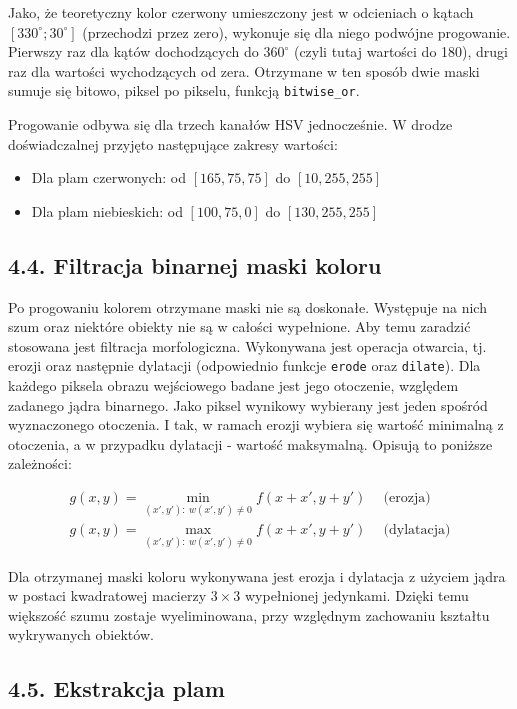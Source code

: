 \documentclass[11pt,a4paper,twoside]{report}
\begin{document}
			Jako, że teoretyczny kolor czerwony umieszczony jest w odcieniach o kątach $[330^\circ; 30^\circ]$ (przechodzi przez zero), wykonuje się dla niego podwójne progowanie. Pierwszy raz dla kątów dochodzących do $360^\circ$ (czyli tutaj wartości do 180), drugi raz dla wartości wychodzących od zera. Otrzymane w ten sposób dwie maski sumuje się bitowo, piksel po pikselu, funkcją \texttt{bitwise\_or}.

			Progowanie odbywa się dla trzech kanałów HSV jednocześnie. W drodze doświadczalnej przyjęto następujące zakresy wartości:
			\begin{itemize}
				\item Dla plam czerwonych: od $[165, 75, 75]$ do $[10, 255, 255]$
				\item Dla plam niebieskich: od $[100, 75, 0]$ do $[130, 255, 255]$
			\end{itemize}

	\subsection*{4.4. Filtracja binarnej maski koloru}

			Po progowaniu kolorem otrzymane maski nie są doskonałe. Występuje na nich szum oraz niektóre obiekty nie są w całości wypełnione. Aby temu zaradzić stosowana jest filtracja morfologiczna. Wykonywana jest operacja otwarcia, tj. erozji oraz następnie dylatacji (odpowiednio funkcje \texttt{erode} oraz \texttt{dilate}). Dla każdego piksela obrazu wejściowego badane jest jego otoczenie, względem zadanego jądra binarnego. Jako piksel wynikowy wybierany jest jeden spośród wyznaczonego otoczenia. I tak, w ramach erozji wybiera się wartość minimalną z otoczenia, a w przypadku dylatacji - wartość maksymalną. Opisują to poniższe zależności:

			\begin{align}
				g(x, y) = \min_{(x', y'):~w(x', y') \neq 0} f(x + x', y + y')~~&\text{(erozja)} \\
				g(x, y) = \max_{(x', y'):~w(x', y') \neq 0} f(x + x', y + y')~~&\text{(dylatacja)}
			\end{align}

			Dla otrzymanej maski koloru wykonywana jest erozja i dylatacja z użyciem jądra w postaci kwadratowej macierzy $3\times3$ wypełnionej jedynkami. Dzięki temu większość szumu zostaje wyeliminowana, przy względnym zachowaniu kształtu wykrywanych obiektów.

	\subsection*{4.5. Ekstrakcja plam}
\end{document}
